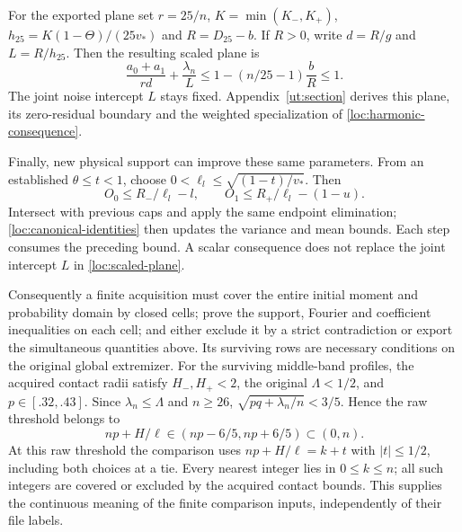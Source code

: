 For the exported plane set $r=25/n$, $K=\min(K_-,K_+)$,
$h_{25}=K(1-\Theta)/(25v_*)$ and $R=D_{25}-b$.
If $R>0$, write $d=R/g$ and $L=R/h_{25}$. Then
the resulting scaled plane is
\begin{equation}\label{loc:scaled-plane}
 \frac{a_0+a_1}{rd}+\frac{\lambda_n}{L}
 \le1-(n/25-1)\frac bR\le1.
\end{equation}
The joint noise intercept $L$ stays fixed. Appendix~\ref{ut:section}
derives this plane, its zero-residual boundary and the weighted
specialization of \eqref{loc:harmonic-consequence}.

Finally, new physical support can improve these same parameters.
From an established $\theta\le t<1$, choose
$0<\ell_l\le\sqrt{(1-t)/v_*}$. Then
\[
 O_0\le R_-/\ell_l-l,\qquad
 O_1\le R_+/\ell_l-(1-u).
\]
Intersect with previous caps and apply the same endpoint elimination;
\eqref{loc:canonical-identities} then updates the variance and mean
bounds. Each step consumes the preceding bound. A scalar consequence
does not replace the joint intercept $L$ in \eqref{loc:scaled-plane}.

Consequently a finite acquisition must cover the entire initial moment
and probability domain by closed cells; prove the support, Fourier and
coefficient inequalities on each cell; and either exclude it by a strict
contradiction or export the simultaneous quantities above. Its surviving
rows are necessary conditions on the original global extremizer.
For the surviving middle-band profiles, the acquired contact radii
satisfy $H_-,H_+<2$, the original $\Lambda<1/2$, and
$p\in[.32,.43]$. Since $\lambda_n\le\Lambda$ and $n\ge26$,
$\sqrt{pq+\lambda_n/n}<3/5$. Hence the raw threshold belongs to
\[
 np+H/\ell\in(np-6/5,np+6/5)\subset(0,n).
\]
At this raw threshold the comparison uses
$np+H/\ell=k+t$ with $|t|\le1/2$, including both choices at a tie.
Every nearest integer lies in $0\le k\le n$; all such integers are
covered or excluded by the acquired contact bounds.
This supplies the continuous meaning of the finite
comparison inputs, independently of their file labels.

